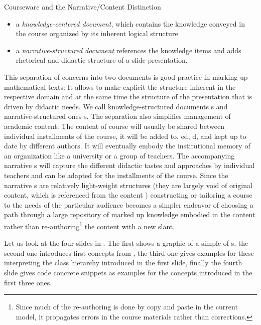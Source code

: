 \begin{tchapter}[id=courseware]{Courseware and the Narrative/Content Distinction}
\begin{itemize}
\item a {\emph{knowledge-centered document}}, which contains
  the knowledge conveyed in the course organized by its inherent logical structure
\item a {\emph{narrative-structured document}}
  references the knowledge items and adds rhetorical and didactic structure of a
  slide presentation.
\end{itemize}
This separation of concerns into two documents is good practice in marking up mathematical
texts: It allows to make explicit the structure inherent in the respective domain and at
the same time the structure of the presentation that is driven by didactic needs. We
call knowledge-structured documents {s} and narrative-structured
ones {s}.  The separation also simplifies management of academic
content: The content {\omdoc} of course will usually be shared
between individual installments of the course, it will be added to,
{ed}, {d}, and kept up to date by different
authors. It will eventually embody the institutional memory of an organization like a
university or a group of teachers.  The accompanying narrative {\omdoc}s will capture the
different didactic tastes and approaches by individual teachers and can be adapted for the
installments of the course. Since the narrative {\omdoc}s are relatively light-weight
structures (they are largely void of original content, which is referenced from the
content {\omdoc}) constructing or tailoring a course to the needs of the particular
audience becomes a simpler endeavor of choosing a path through a large repository of
marked up knowledge embodied in the content {\omdoc} rather than
re-authoring\footnote{Since much of the re-authoring is done by copy and paste in the
  current model, it propagates errors in the course materials rather than corrections.}
the content with a new slant.

Let us look at the four slides in {}. The first
{} shows a graphic of a simple {} of
{s}, the second one introduces first concepts from
{}, the
third one gives examples for these interpreting the class hierarchy introduced in
the first slide, finally the fourth slide gives code concrete snippets as examples
for the concepts introduced in the first three ones.


\end{tchapter}
